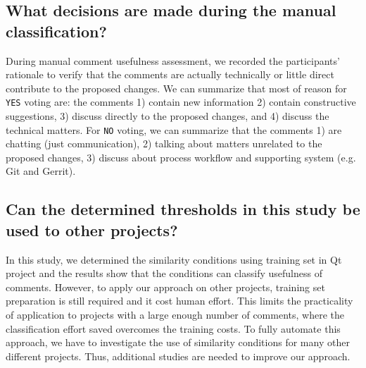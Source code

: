 \subsection{What decisions are made during the manual classification?}
During manual comment usefulness assessment, we recorded the participants' rationale to verify that the comments are actually technically or little direct contribute to the proposed changes. We can summarize that most of reason for \texttt{YES} voting are: the comments 1) contain new information 2) contain constructive suggestions, 3) discuss directly to the proposed changes, and 4) discuss the technical matters. For \texttt{NO} voting, we can summarize that the comments 1) are chatting (just communication), 2) talking about matters unrelated to the proposed changes, 3) discuss about process workflow and supporting system (e.g. Git and Gerrit).
%
%
%

\subsection{Can the determined thresholds in this study be used to other projects?}

In this study, we determined the similarity conditions using training set in Qt project and the results show that the conditions can classify usefulness of comments.
However, to apply our approach on other projects, training set preparation is still required and it cost human effort.
This limits the practicality of application to projects with a large enough number of comments, where the classification effort saved overcomes the training costs.
To fully automate this approach, we have to investigate the use of similarity conditions for many other different projects. Thus, additional studies are needed to improve our approach. 

